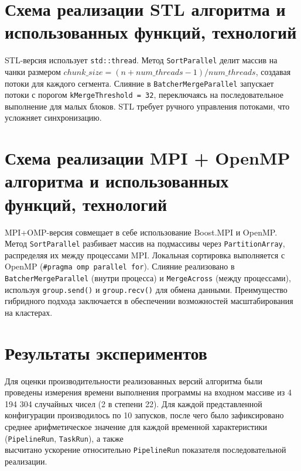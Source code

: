\documentclass[a4paper,12pt]{article}
\begin{document}
\section*{Схема реализации STL алгоритма и использованных функций, технологий}
STL-версия использует \texttt{std::thread}. Метод \texttt{SortParallel} делит массив на чанки размером \(chunk\_size = (n + num\_threads - 1) / num\_threads\), создавая потоки для каждого сегмента. 
Слияние в \texttt{BatcherMergeParallel} запускает потоки с порогом \texttt{kMergeThreshold = 32}, переключаясь на последовательное выполнение для малых блоков. STL требует ручного управления потоками, что усложняет синхронизацию.

\section*{Схема реализации MPI + OpenMP алгоритма и использованных функций, технологий}
MPI+OMP-версия совмещает в себе использование Boost.MPI и OpenMP. Метод \texttt{SortParallel} разбивает массив на подмассивы через \texttt{PartitionArray}, распределяя их между процессами MPI. 
Локальная сортировка выполняется с OpenMP (\texttt{\#pragma omp parallel for}). Слияние реализовано в \texttt{BatcherMergeParallel} (внутри процесса) и \texttt{MergeAcross} (между процессами), используя \texttt{group.send()} и \texttt{group.recv()} для обмена данными. 
Преимущество гибридного подхода заключается в обеспечении возможностей масштабирования на кластерах.

\section*{Результаты экспериментов}
Для оценки производительности реализованных версий алгоритма были проведены измерения времени выполнения программы на входном массиве из 4 194 304 случайных чисел (2 в степени 22). 
Для каждой представленной конфигурации производилось по 10 запусков, после чего было зафиксировано среднее арифметическое значение для каждой временной характеристики (\texttt{PipelineRun}, \texttt{TaskRun}), а также \\высчитано ускорение относительно \texttt{PipelineRun} показателя последовательной реализации.
\end{document}
